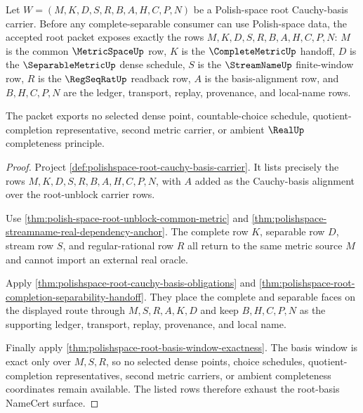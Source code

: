 \begin{theorem}
\label{thm:polishspace-root-basis-namecert-exhaustion}
Let $W=(M,K,D,S,R,B,A,H,C,P,N)$ be a Polish-space root Cauchy-basis carrier. Before any complete-separable consumer can use Polish-space data, the accepted root packet exposes exactly the rows $M,K,D,S,R,B,A,H,C,P,N$: $M$ is the common $\MetricSpaceUp$ row, $K$ is the $\CompleteMetricUp$ handoff, $D$ is the $\SeparableMetricUp$ dense schedule, $S$ is the $\StreamNameUp$ finite-window row, $R$ is the $\RegSeqRatUp$ readback row, $A$ is the basis-alignment row, and $B,H,C,P,N$ are the ledger, transport, replay, provenance, and local-name rows.

The packet exports no selected dense point, countable-choice schedule, quotient-completion representative, second metric carrier, or ambient $\RealUp$ completeness principle.
\end{theorem}
\begin{proof}
Project \autoref{def:polishspace-root-cauchy-basis-carrier}. It lists precisely the rows $M,K,D,S,R,B,A,H,C,P,N$, with $A$ added as the Cauchy-basis alignment over the root-unblock carrier rows.

Use \autoref{thm:polish-space-root-unblock-common-metric} and \autoref{thm:polishspace-streamname-real-dependency-anchor}. The complete row $K$, separable row $D$, stream row $S$, and regular-rational row $R$ all return to the same metric source $M$ and cannot import an external real oracle.

Apply \autoref{thm:polishspace-root-cauchy-basis-obligations} and \autoref{thm:polishspace-root-completion-separability-handoff}. They place the complete and separable faces on the displayed route through $M,S,R,A,K,D$ and keep $B,H,C,P,N$ as the supporting ledger, transport, replay, provenance, and local name.

Finally apply \autoref{thm:polishspace-root-basis-window-exactness}. The basis window is exact only over $M,S,R$, so no selected dense points, choice schedules, quotient-completion representatives, second metric carriers, or ambient completeness coordinates remain available. The listed rows therefore exhaust the root-basis NameCert surface.
\end{proof}

